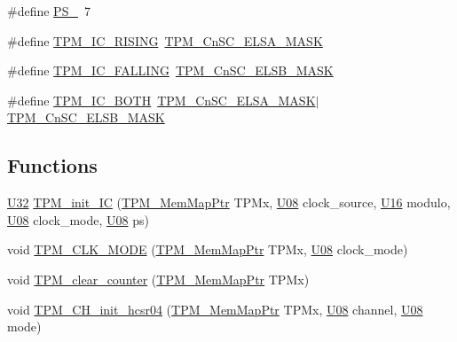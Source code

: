 \begin{DoxyCompactItemize}
\item 
\#define \hyperlink{tpm__hc-sr04_8h_a8862127136c67058e7bf4007646bb68d}{P\+S\+\_}~7
\item 
\#define \hyperlink{tpm__hc-sr04_8h_ab44acfdb24b901a8097e384c44f8129b}{T\+P\+M\+\_\+\+I\+C\+\_\+\+R\+I\+S\+I\+NG}~\hyperlink{group___t_p_m___register___masks_ga2e5b9e774ab4f1ad012602f399949dbf}{T\+P\+M\+\_\+\+Cn\+S\+C\+\_\+\+E\+L\+S\+A\+\_\+\+M\+A\+SK}
\item 
\#define \hyperlink{tpm__hc-sr04_8h_a2cf35e97bb9b97b3fd2fbb678bcdc2cc}{T\+P\+M\+\_\+\+I\+C\+\_\+\+F\+A\+L\+L\+I\+NG}~\hyperlink{group___t_p_m___register___masks_ga147b60bd08ffe27748d03dfeb6fcc327}{T\+P\+M\+\_\+\+Cn\+S\+C\+\_\+\+E\+L\+S\+B\+\_\+\+M\+A\+SK}
\item 
\#define \hyperlink{tpm__hc-sr04_8h_ab1ae3178ab09f02ceaee88d6653fefa7}{T\+P\+M\+\_\+\+I\+C\+\_\+\+B\+O\+TH}~\hyperlink{group___t_p_m___register___masks_ga2e5b9e774ab4f1ad012602f399949dbf}{T\+P\+M\+\_\+\+Cn\+S\+C\+\_\+\+E\+L\+S\+A\+\_\+\+M\+A\+SK}$\vert$\hyperlink{group___t_p_m___register___masks_ga147b60bd08ffe27748d03dfeb6fcc327}{T\+P\+M\+\_\+\+Cn\+S\+C\+\_\+\+E\+L\+S\+B\+\_\+\+M\+A\+SK}
\end{DoxyCompactItemize}
\subsection*{Functions}
\begin{DoxyCompactItemize}
\item 
\hyperlink{_types_8h_a811024d35b9b8a41095b1f583b649e56}{U32} \hyperlink{tpm__hc-sr04_8h_a1e776e3466a943f1d4b317f052e18068}{T\+P\+M\+\_\+init\+\_\+\+IC} (\hyperlink{group___t_p_m___peripheral_ga32147338cedc9904efff0d19b3a358ac}{T\+P\+M\+\_\+\+Mem\+Map\+Ptr} T\+P\+Mx, \hyperlink{_types_8h_a3fd534ebc238a0e487b81bda78811de6}{U08} clock\+\_\+source, \hyperlink{_types_8h_adf928e51a60dba0df29d615401cc55a8}{U16} modulo, \hyperlink{_types_8h_a3fd534ebc238a0e487b81bda78811de6}{U08} clock\+\_\+mode, \hyperlink{_types_8h_a3fd534ebc238a0e487b81bda78811de6}{U08} ps)
\item 
void \hyperlink{tpm__hc-sr04_8h_abf0978ac5f9b9ca8dd0f83c17dd2e483}{T\+P\+M\+\_\+\+C\+L\+K\+\_\+\+M\+O\+DE} (\hyperlink{group___t_p_m___peripheral_ga32147338cedc9904efff0d19b3a358ac}{T\+P\+M\+\_\+\+Mem\+Map\+Ptr} T\+P\+Mx, \hyperlink{_types_8h_a3fd534ebc238a0e487b81bda78811de6}{U08} clock\+\_\+mode)
\item 
void \hyperlink{tpm__hc-sr04_8h_add8fad7433fe594968683eb87d6c4469}{T\+P\+M\+\_\+clear\+\_\+counter} (\hyperlink{group___t_p_m___peripheral_ga32147338cedc9904efff0d19b3a358ac}{T\+P\+M\+\_\+\+Mem\+Map\+Ptr} T\+P\+Mx)
\item 
void \hyperlink{tpm__hc-sr04_8h_add9b5ccc1a966f818d2ba4d3961b2688}{T\+P\+M\+\_\+\+C\+H\+\_\+init\+\_\+hcsr04} (\hyperlink{group___t_p_m___peripheral_ga32147338cedc9904efff0d19b3a358ac}{T\+P\+M\+\_\+\+Mem\+Map\+Ptr} T\+P\+Mx, \hyperlink{_types_8h_a3fd534ebc238a0e487b81bda78811de6}{U08} channel, \hyperlink{_types_8h_a3fd534ebc238a0e487b81bda78811de6}{U08} mode)
\end{DoxyCompactItemize}


